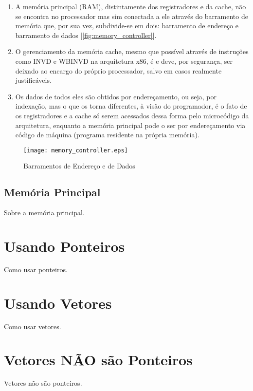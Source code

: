 \begin{enumerate}
\item A memória principal (RAM), distintamente dos registradores e da cache, não se encontra no processador mas sim conectada a ele através do barramento de memória que, por sua vez, subdivide-se em dois: barramento de endereço e barramento de dados [\autoref{fig:memory_controller}].
\item O gerenciamento da memória cache, mesmo que possível através de instruções como INVD e WBINVD na arquitetura x86, é e deve, por segurança, ser deixado ao encargo do próprio processador, salvo em casos realmente justificáveis.
\item Os dados de todos eles são obtidos por endereçamento, ou seja, por indexação, mas o que os torna diferentes, à visão do programador, é o fato de os registradores e a cache só serem acessados dessa forma pelo microcódigo da arquitetura, enquanto a memória principal pode o ser por endereçamento via código de máquina (programa residente na própria memória).
\end{enumerate}

\begin{figure}[!htp]
  \centering
  \texttt{[image: memory\_controller.eps]}
  \caption{Barramentos de Endereço e de Dados}
 \label{fig:memory_controller}
\end{figure}


\subsection{Memória Principal}

Sobre a memória principal.


\section{Usando Ponteiros}

Como usar ponteiros.


\section{Usando Vetores}

Como usar vetores.


\section{Vetores NÃO são Ponteiros}

Vetores não são ponteiros.